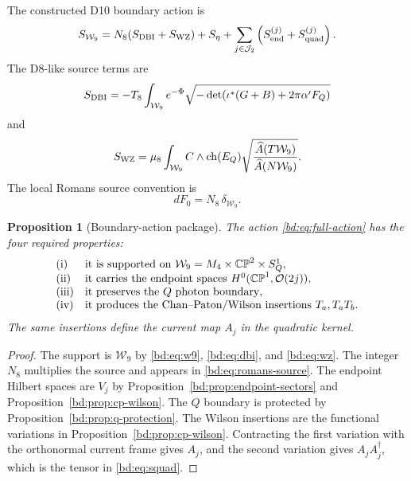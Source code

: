 \documentclass[11pt]{article}
\newcommand{\CP}{\mathbb{CP}}
\newcommand{\JJ}{\mathcal{J}}
\newcommand{\WW}{\mathcal{W}}
\newcommand{\OO}{\mathcal{O}}
\theoremstyle{plain}
\newtheorem{proposition}{Proposition}[section]
\theoremstyle{definition}
\begin{document}
The constructed D10 boundary action is
\begin{equation}
  S_{\WW_9}
  =
  N_8(S_{\rm DBI}+S_{\rm WZ})+S_\eta
  +\sum_{j\in\JJ_2}\left(S_{\rm end}^{(j)}+S_{\rm quad}^{(j)}\right).
  \label{bd:eq:full-action}
\end{equation}
The D8-like source terms are
\begin{equation}
  S_{\rm DBI}
  =
  -T_8\int_{\WW_9}
  e^{-\Phi}
  \sqrt{-\det\!\left(\iota^*(G+B)+2\pi\alpha'F_Q\right)}
  \label{bd:eq:dbi}
\end{equation}
and
\begin{equation}
  S_{\rm WZ}
  =
  \mu_8\int_{\WW_9}
  C\wedge{\rm ch}(E_Q)
  \sqrt{\frac{\widehat A(T\WW_9)}{\widehat A(N\WW_9)}} .
  \label{bd:eq:wz}
\end{equation}
The local Romans source convention is
\begin{equation}
  dF_0=N_8\,\delta_{\WW_9}.
  \label{bd:eq:romans-source}
\end{equation}

\begin{proposition}[Boundary-action package]
\label{bd:prop:package}
The action \eqref{bd:eq:full-action} has the four required properties:
\[
\begin{array}{ll}
{\rm (i)} & \hbox{it is supported on }\WW_9=M_4\times\CP^2\times S^1_Q,\\
{\rm (ii)} & \hbox{it carries the endpoint spaces }H^0(\CP^1,\OO(2j)),\\
{\rm (iii)} & \hbox{it preserves the }Q\hbox{ photon boundary},\\
{\rm (iv)} & \hbox{it produces the Chan--Paton/Wilson insertions }T_a,T_aT_b .
\end{array}
\]
The same insertions define the current map \(A_j\) in the quadratic kernel.
\end{proposition}

\begin{proof}
The support is \(\WW_9\) by \eqref{bd:eq:w9}, \eqref{bd:eq:dbi}, and \eqref{bd:eq:wz}.
The integer \(N_8\) multiplies the source and appears in
\eqref{bd:eq:romans-source}.
The endpoint Hilbert spaces are \(V_j\) by Proposition~\ref{bd:prop:endpoint-sectors}
and Proposition~\ref{bd:prop:cp-wilson}.  The \(Q\) boundary is protected by
Proposition~\ref{bd:prop:q-protection}.  The Wilson insertions are the functional
variations in Proposition~\ref{bd:prop:cp-wilson}.  Contracting the first
variation with the orthonormal current frame gives \(A_j\), and the second
variation gives \(A_jA_j^\dagger\), which is the tensor in
\eqref{bd:eq:squad}.
\end{proof}
\end{document}
